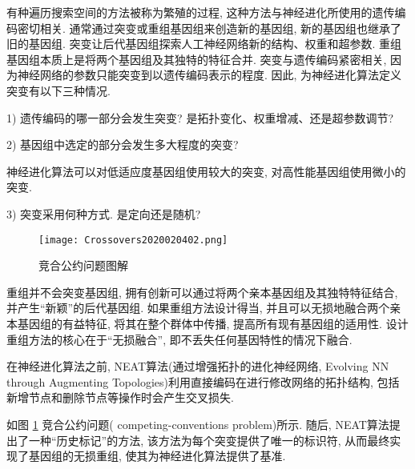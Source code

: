 \begin{remark}
    有种遍历搜索空间的方法被称为繁殖的过程, 这种方法与神经进化所使用的遗传编码密切相关. 通常通过突变或重组基因组来创造新的基因组, 新的基因组也继承了旧的基因组. 突变让后代基因组探索人工神经网络新的结构、权重和超参数. 重组基因组本质上是将两个基因组及其独特的特征合并.
突变与遗传编码紧密相关, 因为神经网络的参数只能突变到以遗传编码表示的程度. 因此, 为神经进化算法定义突变有以下三种情况.

1) 遗传编码的哪一部分会发生突变? 是拓扑变化、权重增减、还是超参数调节?

2) 基因组中选定的部分会发生多大程度的突变?
\begin{example}
    神经进化算法可以对低适应度基因组使用较大的突变, 对高性能基因组使用微小的突变.
\end{example}

3) 突变采用何种方式. 是定向还是随机?
\begin{figure}[H]
    \centering
    \texttt{[image: Crossovers2020020402.png]}
    \caption{竞合公约问题图解}
    \label{Crossovers2020020402}
\end{figure}

重组并不会突变基因组, 拥有创新可以通过将两个亲本基因组及其独特特征结合, 并产生“新颖”的后代基因组. 如果重组方法设计得当, 并且可以无损地融合两个亲本基因组的有益特征, 将其在整个群体中传播, 提高所有现有基因组的适用性.
设计重组方法的核心在于“无损融合”, 即不丢失任何基因特性的情况下融合.
\begin{example}
    在神经进化算法之前, NEAT算法(通过增强拓扑的进化神经网络, Evolving NN through Augmenting Topologies)利用直接编码在进行修改网络的拓扑结构, 包括新增节点和删除节点等操作时会产生交叉损失.
\end{example}

如图 \ref{Crossovers2020020402} 竞合公约问题( competing-conventions problem)所示. 随后, NEAT算法提出了一种“历史标记”的方法, 该方法为每个突变提供了唯一的标识符, 从而最终实现了基因组的无损重组, 使其为神经进化算法提供了基准.
\end{remark}


